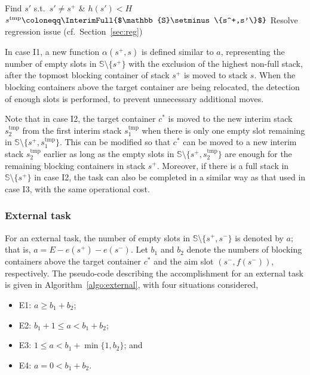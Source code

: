 \documentclass[review,3p,times,12pt,number]{elsarticle}\usepackage{amsmath}\usepackage{amssymb}
\renewcommand{\gets}{\coloneqq}
\newcommand{\mts}{s^\mathrm{tmp}}
\begin{document}
\begin{algorithm*}[htbp]
\begin{multicols}{2}
  {
    Find $s'$ s.t.\ $s'\neq s^+$ \& $h(s')<H$\;
    $\mts\gets \InterimFull{$\mathbb{S}\setminus\{s^+,s'\}$}$\;\label{line:wholly}
    \BiSender{$\mts, 1, s^+, b_1, \{s'\}$}\;\label{line:dualsender}
    \Move{$s^+, 1, \mts$}\;
    \;
    \Move{$\mts, 1, s^+$}\;
    Resolve regression issue (cf.\ Section~\ref{sec:reg})\;
  }

\end{multicols}
\BlankLine
\BlankLine
\end{algorithm*}

In case I1, a new function $\alpha(s^+,s)$ is defined similar to $a$, representing the number of empty slots in $\mathbb{S}\setminus\{s^+\}$ with the exclusion of the highest non-full stack, after the topmost blocking container of stack $s^+$ is moved to stack $s$. When the blocking containers above the target container are being relocated, the detection of enough slots is performed,  to prevent unnecessary additional moves.

Note that in case I2, the target container $c^*$ is moved to the new interim stack $\mts_2$ from the first interim stack $\mts_1$ when there is only one empty slot remaining in $\mathbb{S}\setminus\{s^+,\mts_1\}$. This can be modified so that $c^*$ can be moved to a new interim stack $\mts_2$ earlier as long as the empty slots in $\mathbb{S}\setminus\{s^+,\mts_2\}$ are enough for the remaining blocking containers in stack $s^+$. Moreover, if there is a full stack in $\mathbb{S}\setminus\{s^+\}$ in case I2, the task can also be completed in a similar way as that used in case I3, with the same operational cost.

\subsubsection{External task}

For an external task, the number of empty slots in $\mathbb{S}\setminus\{s^+,s^-\}$ is denoted by $a$; that is, $a=E-e(s^+)-e(s^-)$. Let $b_1$ and $b_2$ denote the numbers of blocking containers above the target container $c^*$ and the aim slot $(s^-,f(s^-))$, respectively. The pseudo-code describing the accomplishment for an external task is given in Algorithm~\ref{algo:external}, with four situations considered,\begin{itemize}
\item E1: $a\ge b_1+b_2$;
\item E2: $b_1+1\le a<b_1+b_2$; 
\item E3: $1\le a<b_1+\min\{1,b_2\}$; and
\item E4: $a=0<b_1+b_2$.
\end{itemize}
\end{document}
